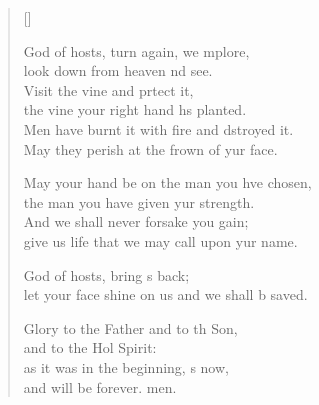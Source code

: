 \begin{verse}[\versewidth]
\begin{patverse}
God of hosts, turn again, we \pointup{\i}mplore,\Med\\
look down from heaven nd see.\\
Visit the vine and prtect it,\Med\\
the vine your right hand hs planted.\\
Men have burnt it with fire and dstroyed it.\Med\\
May they perish at the frown of yur face.

May your hand be on the man you hve chosen,\Med\\
the man you have given yur strength.\\
And we shall never forsake you gain;\Med\\
give us life that we may call upon yur name.

God of hosts, bring s back;\Med\\
let your face shine on us and we shall b saved.

Glory to the Father and to th Son,\Med\\
and to the Hol Spirit:\\
as it was in the beginning, \pointup{\i}s now,\Med\\
and will be forever. men.
  \end{patverse}
\end{verse}
